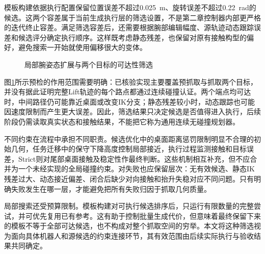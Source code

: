 模板构建依据执行配置保留位置误差不超过0.025~m、旋转误差不超过0.22~rad的候选。这两个容差属于当前生成执行层的筛选设置，不是第二章控制器内部更严格的迭代终止容差。满足筛选容差后，还需要根据腕部编辑幅度、源轨迹动态跟踪误差和候选评分确定执行顺序。这样既考虑静态残差，也保留对原有接触构型的偏好，避免搜索一开始就使用偏移很大的变体。

\begin{figure}[htbp]
 \centering
 \caption{局部腕姿态扩展与两个目标的可达性筛选}
 \label{fig:ch03_reachability}
\end{figure}

图\ref{fig:ch03_reachability}所示预检的作用范围需要明确：已核验实现主要覆盖预抓取与抓取两个目标，并没有据此证明完整Lift轨迹的每个路点都通过连续碰撞认证。两个端点均可达时，中间路径仍可能靠近桌面或改变IK分支；静态残差较小时，动态跟踪也可能因速度限制而产生更大误差。因此，筛选结果只决定候选是否值得进入执行，后续阶段仍需读取真实状态和接触结果，不能把它称为通用连续无碰撞规划器。

不同约束在流程中承担不同职责。候选优化中的桌面距离惩罚限制明显不合理的初始几何，任务迁移中的保守下降高度控制局部接近，执行过程监测接触和目标误差，Strict则对尾部桌面接触及稳定性作最终判断。这些机制相互补充，但不应合并为一个未经实现的全局碰撞约束。对失败也应保留层次：无有效候选、静态IK残差过大、动态接近偏差、闭合后缺少对向接触和抬升失稳对应不同问题。只有明确失败发生在哪一层，才能避免把所有失败归因于抓取几何质量。

局部搜索还受预算限制。模板构建对可执行候选排序后，只运行有限数量的完整尝试，并可优先复用已有参考。这有助于控制批量生成代价，但意味着最终保留下来的模板不等于全部可达候选，也不构成对整个抓取空间的穷举。本文将这种筛选视为面向具体机器人和源候选的约束连接环节，其有效范围由后续实际执行与验收结果共同确定。

